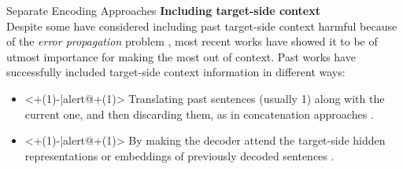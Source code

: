 
\begin{frame}{Separate Encoding Approaches}
	\textbf{Including target-side context}\\
	Despite some have considered including past target-side context harmful because of the \textit{error propagation} problem \cite{zhang_improving_2018}, most recent works have showed it to be of utmost importance for making the most out of context. Past works have successfully included target-side context information in different ways:
	\begin{itemize}
		\item<+(1)-|alert@+(1)> Translating past sentences (usually 1) along with the current one, and then discarding them, as in concatenation approaches \cite{bawden_evaluating_2018}.
		\item<+(1)-|alert@+(1)> By making the decoder attend the target-side hidden representations or embeddings of previously decoded sentences \cite{miculicich_document-level_2018,voita_when_2019,maruf_selective_2019,zheng_toward_2020}.
	\end{itemize}
\end{frame}

